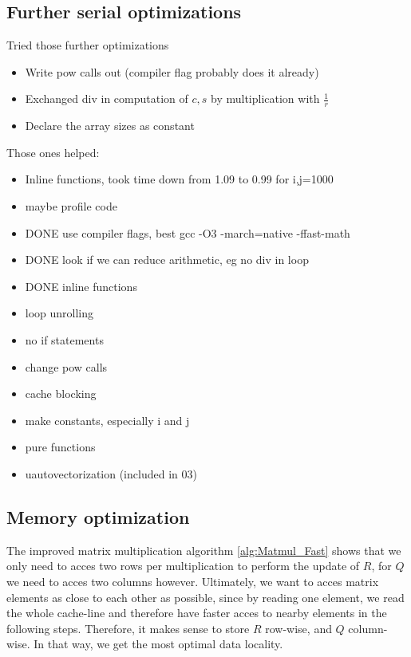\documentclass[a4paper]{scrartcl}
\begin{document}
    \subsection{Further serial optimizations}
        Tried those further optimizations
        \begin{itemize}
            \item Write pow calls out (compiler flag probably does it already)
            \item Exchanged div in computation of $c,s$ by multiplication with $\frac{1}{r}$
            \item Declare the array sizes as constant
        \end{itemize}

        Those ones helped:
        \begin{itemize}
            \item Inline functions, took time down from 1.09 to 0.99 for i,j=1000
        \end{itemize}

        \begin{itemize}
            \item maybe profile code
            \item DONE use compiler flags, best gcc -O3 -march=native -ffast-math
            \item DONE look if we can reduce arithmetic, eg no div in loop
            \item DONE inline functions
            \item loop unrolling
            \item no if statements
            \item change pow calls
            \item cache blocking
            \item make constants, especially i and j
            \item pure functions
            \item uautovectorization (included in 03)
        \end{itemize}

    \subsection{Memory optimization}
        The improved matrix multiplication algorithm \ref{alg:Matmul_Fast} shows
        that we only need to acces two rows per multiplication to perform the
        update of $R$, for $Q$ we need to acces two columns however. Ultimately,
        we want to acces matrix elements as close to each other as possible,
        since by reading one element, we read the whole cache-line and therefore
        have faster acces to nearby elements in the following steps. Therefore,
        it makes sense to store $R$ row-wise, and $Q$ column-wise. In that way,
        we get the most optimal data locality.
\end{document}
